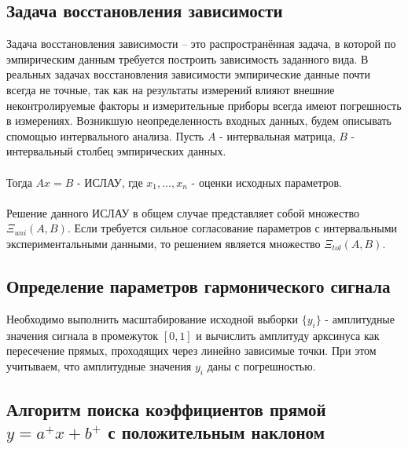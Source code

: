 \documentclass[a4paper]{article}
\begin{document}
\subsection{Задача восстановления зависимости}
    Задача восстановления зависимости – это распространённая задача, в которой по эмпирическим данным требуется построить
    зависимость заданного вида. В реальных задачах восстановления зависимости эмпирические данные почти всегда не точные,
    так как на результаты измерений влияют внешние неконтролируемые факторы и измерительные приборы всегда имеют погрешность
    в измерениях. Возникшую неопределенность входных данных, будем описывать спомощью интервального анализа.
    Пусть $A$ - интервальная матрица, $B$ - интервальный столбец эмпирических данных.\\\\
    Тогда $Ax=B$ - ИСЛАУ, где $x_1,\dots,x_n$ - оценки исходных параметров.\\\\
    Решение данного ИСЛАУ в общем случае представляет собой множество $\mathsf{\Xi}_{uni}(A,B)$.
    Если требуется сильное  согласование параметров с интервальными экспериментальными данными, то решением является
    множество $\mathsf{\Xi}_{tol}(A,B)$.

    \subsection{Определение параметров гармонического сигнала}
Необходимо выполнить масштабирование исходной выборки $\{y_i\}$ - амплитудные значения сигнала в промежуток $[0,1]$ и вычислить амплитуду арксинуса как пересечение прямых, проходящих через линейно зависимые точки. При этом учитываем, что амплитудные значения $y_i$ даны с погрешностью.
    \subsection{Алгоритм поиска коэффициентов прямой $y=a^+x+b^+$ с положительным наклоном}
\end{document}
